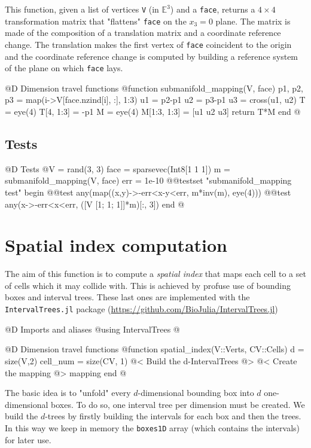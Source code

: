 \documentclass[10pt]{book}
\begin{document}
This function, given a list of vertices \texttt{V} (in $\mathbb{E}^3$) and a 
\texttt{face}, returns a $4\times4$ transformation matrix that "flattens"
\texttt{face} on the $x_3=0$ plane. The matrix is made of the composition of
a translation matrix and a coordinate reference change. The translation
makes the first vertex of \texttt{face} coincident to the origin and
the coordinate reference change is computed by building a reference
system of the plane on which \texttt{face} lays.

@D Dimension travel functions
@{function submanifold_mapping(V, face)
    p1, p2, p3 = map(i->V[face.nzind[i], :], 1:3)
    u1 = p2-p1
    u2 = p3-p1
    u3 = cross(u1, u2)
    T = eye(4)
    T[4, 1:3] = -p1
    M = eye(4)
    M[1:3, 1:3] = [u1 u2 u3]
    return T*M
end
@}
\subsection{Tests}

@D Tests
@{V = rand(3, 3)
face = sparsevec(Int8[1 1 1])
m = submanifold_mapping(V, face)
err = 1e-10 
@@testset "submanifold_mapping test" begin
    @@test any(map((x,y)->-err<x-y<err, m*inv(m), eye(4)))
    @@test any(x->-err<x<err, ([V [1; 1; 1]]*m)[:, 3])
end
@}





\section{Spatial index computation}

The aim of this function is to compute a \textit{spatial index} that maps
each cell to a set of cells which it may collide with.
This is achieved by profuse use of bounding boxes and interval trees. 
These last ones are implemented with the \texttt{IntervalTrees.jl} package
(\url{https://github.com/BioJulia/IntervalTrees.jl})

@D Imports and aliases
@{using IntervalTrees
@}

@D Dimension travel functions
@{function spatial_index(V::Verts, CV::Cells)
    d = size(V,2)
    cell_num = size(CV, 1)
    @< Build the d-IntervalTrees @>
    @< Create the mapping @>
    mapping
end
@}

The basic idea is to "unfold" every $d$-dimensional bounding box into $d$ one-dimensional boxes.
To do so, one interval tree per dimension must be created. 
We build the $d$-trees by firstly building the intervals for each box and then the trees.
In this way we keep in memory the \texttt{boxes1D} array (which contains the intervals) for later use.
\end{document}
